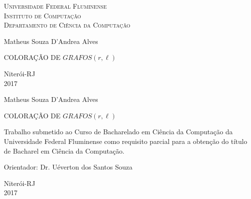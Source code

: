 \documentclass[a4paper,oneside,12pt]{book}
\begin{document}

\begin{titlepage}
  \begin{center}
    \Large{\textsc{Universidade Federal Fluminense} \\
           \textsc{Instituto de Computação} \\
           \textsc{Departamento de Ciência da Computação}
          }
    \par\vspace{3.0cm}
    \LARGE{Matheus Souza D'Andrea Alves}
     \par\vspace{3.0cm}
    \bigskip
    \LARGE{COLORAÇÃO DE $GRAFOS(r,\ell)$}
    \par\vfill
    \Large{Niterói-RJ\\2017}
  \end{center}
\end{titlepage}




\setcounter{page}{2}




\begin{center}
Matheus Souza D'Andrea Alves


\vfill

COLORAÇÃO DE $GRAFOS(r,\ell)$

\vspace{3.0cm}

\begin{flushright}
\begin{minipage}{0.50\textwidth}

Trabalho submetido ao Curso de \linebreak Bacharelado em Ciência da
Computação
da Universidade Federal Fluminense como
requisito parcial para a obtenção do título de Bacharel em Ciência da
Computação.

\end{minipage}
\end{flushright}

\vspace{3.0cm}

\begin{flushleft}
Orientador: Dr. Uéverton dos Santos Souza 
\end{flushleft}

\vfill

Niterói-RJ\\2017

\end{center}
\end{document}
